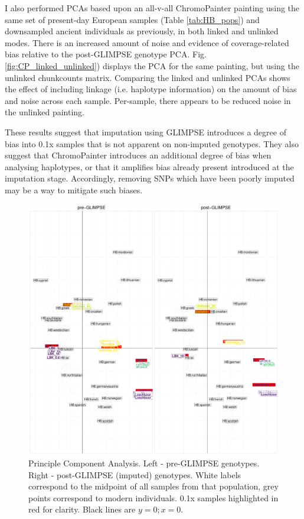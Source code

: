 {I also performed PCAs based upon an all-v-all ChromoPainter painting using the same set of present-day European samples (Table \ref{tab:HB_pops}) and downsampled ancient individuals as previously, in both linked and unlinked modes. There is an increased amount of noise and evidence of coverage-related bias relative to the post-GLIMPSE genotype PCA. Fig. \ref{fig:CP_linked_unlinked}) displays the PCA for the same painting, but using the unlinked chunkcounts matrix. Comparing the linked and unlinked PCAs shows the effect of including linkage (i.e. haplotype information) on the amount of bias and noise across each sample. Per-sample, there appears to be reduced noise in the unlinked painting.

These results suggest that imputation using GLIMPSE introduces a degree of bias into 0.1x samples that is not apparent on non-imputed genotypes. They also suggest that ChromoPainter introduces an additional degree of bias when analysing haplotypes, or that it amplifies bias already present introduced at the imputation stage. Accordingly, removing SNPs which have been poorly imputed may be a way to mitigate such biases.

\begin{figure}[htp]
    \centering
    \includegraphics[width=1.0\textwidth]{../images/chapter1/pre_post_GLIMPSE_PCA.pdf}
    \caption{Principle Component Analysis. Left - pre-GLIMPSE genotypes. Right - post-GLIMPSE (imputed) genotypes. White labels correspond to the midpoint of all samples from that population, grey points correspond to modern individuals. 0.1x samples highlighted in red for clarity. Black lines are $y=0; x=0$.}
    \label{fig:pre_GLIMPSE_PCA}
\end{figure}

}
